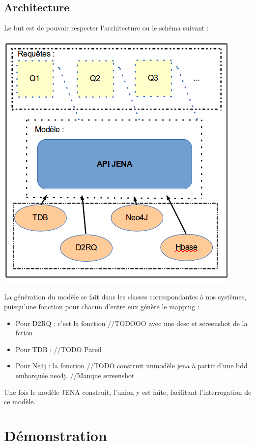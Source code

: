 \documentclass{article}
\begin{document}
\subsection{Architecture}
Le but est de pouvoir respecter l'architecture ou le schéma suivant : \\
\begin{center}
\includegraphics[scale=0.5]{archi_appli.png} 
\label{fig_appli}
\end{center}
La génération du modèle se fait dans les classes correspondantes à nos systèmes, puisqu'une fonction pour chacun d'entre eux génère le mapping :
\begin{itemize}
\item Pour D2RQ : c'est la fonction //TODOOO avec une desc et screenshot de la fction
\item Pour TDB : //TODO Pareil
\item Pour Ne4j : la fonction //TODO construit unmodèle jena à partir d'une bdd embarquée neo4j. //Manque screenshot
\end{itemize}
Une fois le modèle JENA construit, l'union y est faite, facilitant l'interrogation de ce modèle.


\section{Démonstration}
\end{document}
